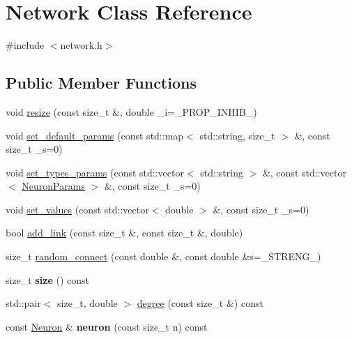 \hypertarget{classNetwork}{}\section{Network Class Reference}
\label{classNetwork}


{\ttfamily \#include $<$network.\+h$>$}

\subsection*{Public Member Functions}
\begin{DoxyCompactItemize}
\item 
void \hyperlink{classNetwork_ae9d6a1913ae92e1d2d7cd17f70f815b5}{resize} (const size\+\_\+t \&, double \+\_\+i=\+\_\+\+P\+R\+O\+P\+\_\+\+I\+N\+H\+I\+B\+\_\+)
\item 
void \hyperlink{classNetwork_ad1d20020028425cfab199da1942172c9}{set\+\_\+default\+\_\+params} (const std\+::map$<$ std\+::string, size\+\_\+t $>$ \&, const size\+\_\+t \+\_\+s=0)
\item 
void \hyperlink{classNetwork_a40daf6578a6146f4c339f0efffd5070d}{set\+\_\+types\+\_\+params} (const std\+::vector$<$ std\+::string $>$ \&, const std\+::vector$<$ \hyperlink{structNeuronParams}{Neuron\+Params} $>$ \&, const size\+\_\+t \+\_\+s=0)
\item 
void \hyperlink{classNetwork_a699416a6462f2da6a5f6cddb30f31440}{set\+\_\+values} (const std\+::vector$<$ double $>$ \&, const size\+\_\+t \+\_\+s=0)
\item 
bool \hyperlink{classNetwork_a6ebe0899329973e4924997a25e205856}{add\+\_\+link} (const size\+\_\+t \&, const size\+\_\+t \&, double)
\item 
size\+\_\+t \hyperlink{classNetwork_a4c751a78c7bc5e27c6b36df78c9c70c0}{random\+\_\+connect} (const double \&, const double \&s=\+\_\+\+S\+T\+R\+E\+N\+G\+\_\+)
\item 
\mbox{\label{classNetwork_a41c54d12d861883170b5c5abca3a7bc8}} 
size\+\_\+t {\bfseries size} () const
\item 
std\+::pair$<$ size\+\_\+t, double $>$ \hyperlink{classNetwork_a313da14a6a430ae14e3943dba78edb61}{degree} (const size\+\_\+t \&) const
\item 
\mbox{\label{classNetwork_a4639c4fd24bc6dc807ae35af6577ed7f}} 
const \hyperlink{classNeuron}{Neuron} \& {\bfseries neuron} (const size\+\_\+t n) const

\end{DoxyCompactItemize}

